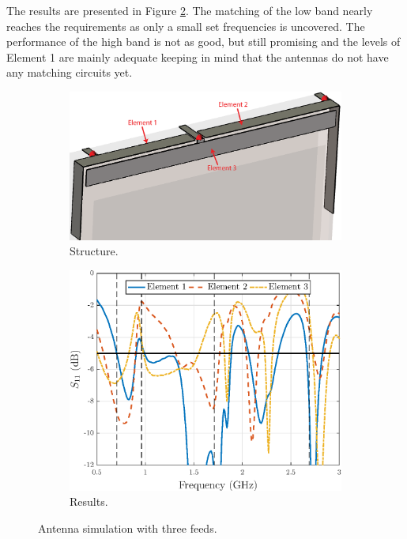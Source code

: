 The results are presented in Figure \ref{fig:concept_3feeds_res}. The matching of the low band nearly reaches the requirements as only a small set frequencies is uncovered. The performance of the high band is not as good, but still promising and the levels of Element 1 are mainly adequate keeping in mind that the antennas do not have any matching circuits yet.
\begin{figure}[H]
    \centering
    \begin{subfigure}[b]{0.49\textwidth}
        \includegraphics[width=\textwidth]{img/concept_3feed_struct.eps}
        \caption{Structure.}
        \label{fig:concept_3feeds_struct}
    \end{subfigure}
    \begin{subfigure}[b]{0.49\textwidth}
        \includegraphics[width=\textwidth]{img/concept_3feeds.eps}
        \caption{Results.}
        \label{fig:concept_3feeds_res}
    \end{subfigure}
    \caption{Antenna simulation with three feeds.}
    \label{fig:concept_3feeds}
\end{figure}



